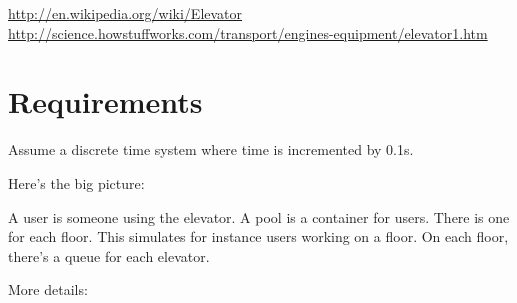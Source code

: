 



\topmatter

\begin{tightlist}
\li \url{http://en.wikipedia.org/wiki/Elevator}
\li \url{http://science.howstuffworks.com/transport/engines-equipment/elevator1.htm}
\end{tightlist}

\section{Requirements}

Assume a discrete time system where time is incremented by 0.1s.

Here's the big picture:
\begin{tightlist}
  \li A user is someone using the elevator.
  \li A pool is a container for users. There is one for each floor.
  This simulates for instance users working on a floor.
  \li On each floor, there's a queue for each elevator. 
\end{tightlist}

More details:

